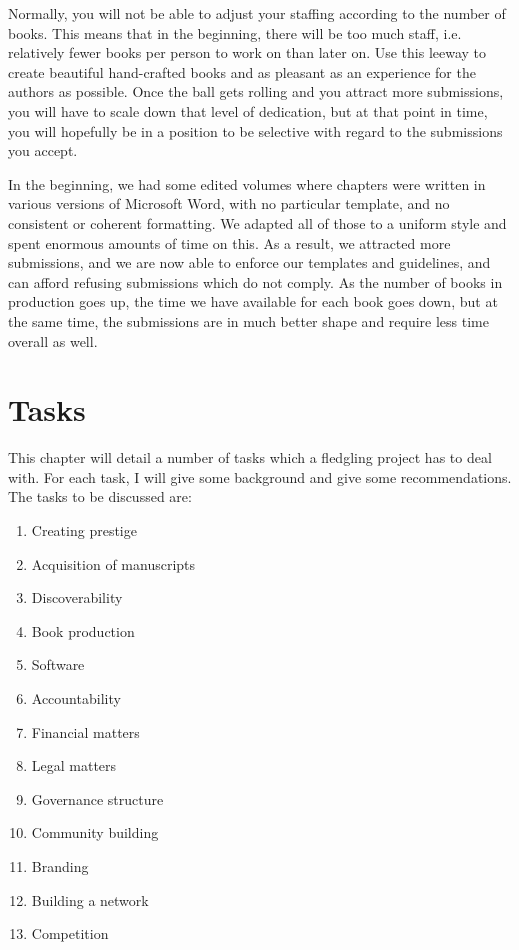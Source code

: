\documentclass[output=guidelines,guidelines] {langscibook}
\begin{document}
Normally, you will not be able to adjust your staffing according to the number of books. This means that in the beginning, there will be too much staff, i.e. relatively fewer books per person to work on than later on. Use this leeway to create beautiful hand-crafted books and as pleasant as an experience for the authors as possible. Once the ball gets rolling and you attract more submissions, you will have to scale down that level of dedication, but at that point in time, you will hopefully be in a position to be selective with regard to the submissions you accept. 

In the beginning, we had some edited volumes where chapters were written in various versions of Microsoft Word, with no particular template, and no consistent or coherent formatting. We adapted all of those to a uniform style and spent enormous amounts of time on this. As a result, we attracted more submissions, and we are now able to enforce our templates and guidelines, and can afford refusing submissions which do not comply. As the number of books in production goes up, the time we have available for each book goes down, but at the same time, the submissions are in much better shape and require less time overall as well. 

\chapter{Tasks}
This chapter will detail a number of tasks which a fledgling project has to deal with. For each task, I will give some background and give some recommendations. The tasks to be discussed are:

\begin{enumerate}
 \item Creating prestige 
 \item Acquisition of manuscripts
 \item Discoverability
 \item Book production
 \item Software
 \item Accountability
 \item Financial matters
 \item Legal matters
 \item Governance structure
 \item Community building
 \item Branding
 \item Building a network
 \item Competition
\end{enumerate}
\end{document}
